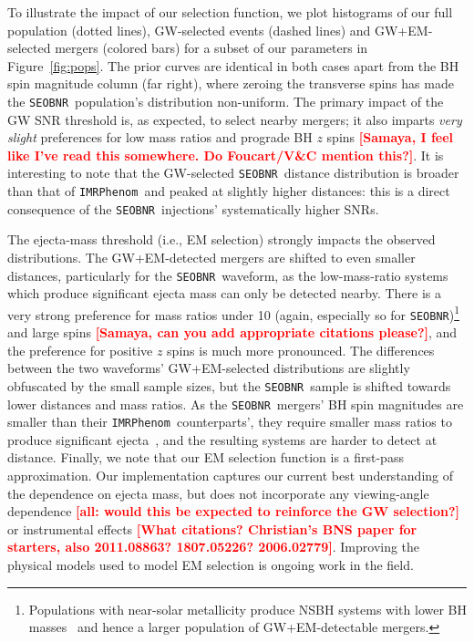 \documentclass[%
 reprint,
 superscriptaddress,
 nofootinbib,
 amsmath,amssymb,
 aps,
]{revtex4-2}
\newcommand{\seobnr}{\texttt{SEOBNR}}
\newcommand{\imrp}{\texttt{IMRPhenom}}
\newcommand{\smf}[1]{\textcolor{red}{\bf [#1]}}
\begin{document}
To illustrate the impact of our selection function, we plot histograms of our full population (dotted lines), GW-selected events (dashed lines) and GW+EM-selected mergers (colored bars) for a subset of our parameters in Figure~\ref{fig:pops}. The prior curves are identical in both cases apart from the BH spin magnitude column (far right), where zeroing the transverse spins has made the \seobnr\ population's distribution non-uniform. The primary impact of the GW SNR threshold is, as expected, to select nearby mergers; it also imparts {\it very slight} preferences for low mass ratios and prograde BH $z$ spins \smf{Samaya, I feel like I've read this somewhere. Do Foucart/V\&C mention this?}. It is interesting to note that the GW-selected \seobnr\ distance distribution is broader than that of \imrp\ and peaked at slightly higher distances: this is a direct consequence of the \seobnr\ injections' systematically higher SNRs.

The ejecta-mass threshold (i.e., EM selection) strongly impacts the observed distributions. The GW+EM-detected mergers are shifted to even smaller distances, particularly for the \seobnr\ waveform, as the low-mass-ratio systems which produce significant ejecta mass can only be detected nearby. There is a very strong preference for mass ratios under 10 (again, especially so for \seobnr)\footnote{Populations with near-solar metallicity produce NSBH systems with lower BH masses~\cite{Kruckow_etal:2018} and hence a larger population of GW+EM-detectable mergers.} and large spins \smf{Samaya, can you add appropriate citations please?}, and the preference for positive $z$ spins is much more pronounced. The differences between the two waveforms' GW+EM-selected distributions are slightly obfuscated by the small sample sizes, but the \seobnr\ sample is shifted towards lower distances and mass ratios. As the \seobnr\ mergers' BH spin magnitudes are smaller than their \imrp\ counterparts', they require smaller mass ratios to produce significant ejecta~\cite{Foucart_etal:2018}, and the resulting systems are harder to detect at distance. Finally, we note that our EM selection function is a first-pass approximation. Our implementation captures our current best understanding of the dependence on ejecta mass, but does not incorporate any viewing-angle dependence \smf{all: would this be expected to reinforce the GW selection?} or instrumental effects \smf{What citations? Christian's BNS paper for starters, also 2011.08863? 1807.05226? 2006.02779}. Improving the physical models used to model EM selection is ongoing work in the field.
\end{document}
